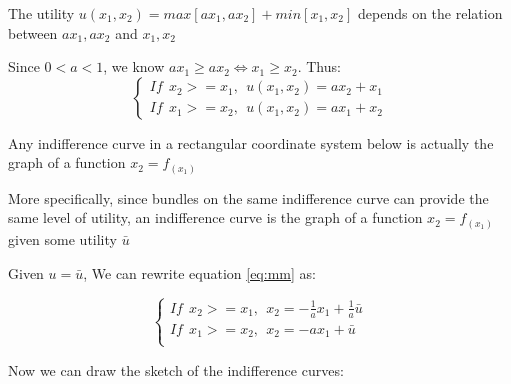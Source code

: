 \documentclass{article}
\begin{document}
The utility $u(x_1, x_2) = max[ax_1, ax_2] + min[x_1, x_2]$ depends on the relation between $ax_1, ax_2$ and $x_1, x_2$

Since $0 < a < 1$, we know $ax_1 \ge ax_2 \iff x_1 \ge x_2$. Thus:
\begin{equation}
  \begin{cases}
If \ \ x_2 >= x_1 ,\ \ u(x_1, x_2) = ax_2 + x_1  \\
If \ \ x_1 >= x_2 ,\ \ u(x_1, x_2) = ax_1 + x_2
  \end{cases}
 \label{eq:mm}
\end{equation}

\begin{mdframed}[backgroundcolor=blue!20,linecolor=white]

Any indifference curve in a rectangular coordinate system below is actually the graph of
a function $x_2 = f_(x_1)$

{\centering
{}
\label{fig:1_27_coor}}

More specifically, since bundles on the same indifference curve can provide the same level of utility,
an indifference curve is the graph of a function $x_2 = f_(x_1)$ given some utility $\bar{u}$

Given  $u = \bar{u}$, We can rewrite equation \ref{eq:mm} as:

\begin{equation}
  \begin{cases}
    If \ \ x_2 >= x_1 ,\ \ x_2 = -\frac{1}{a}x_1 + \frac{1}{a}\bar{u} \\
    If \ \ x_1 >= x_2 ,\ \ x_2 = -ax_1 + \bar{u} \\
  \end{cases}
\end{equation}

Now we can draw the sketch of the indifference curves:

{\centering
{}}
\end{mdframed}
\end{document}
